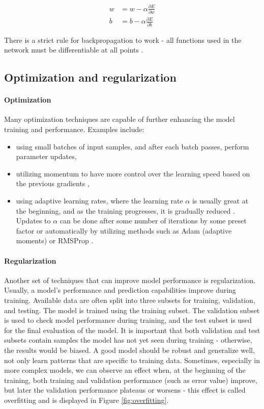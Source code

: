 \begin{align}
\label{eq:w-update}
w &= w - \alpha \frac{\partial E}{\partial w} \\
\label{eq:b-update}
b &=  b - \alpha \frac{\partial E}{\partial b}
\end{align}

There is a strict rule for backpropagation to work - all functions used in the network must be differentiable at all points \cite{Rumelhart1986, Santosh2022-2}.

\subsection{Optimization and regularization}

\paragraph{Optimization}
Many optimization techniques are capable of further enhancing the model training and performance. Examples include:

\begin{itemize}
    \item using small batches of input samples, and after each batch passes, perform parameter updates,
    \item utilizing momentum \cite{Polyak1964} to have more control over the learning speed based on the previous gradients \cite{Santosh2022-2},
    \item using adaptive learning rates, where the learning rate $\alpha$ is usually great at the beginning, and as the training progresses, it is gradually reduced \cite{Santosh2022-2}. Updates to $\alpha$ can be done after some number of iterations by some preset factor or automatically by utilizing methods such as Adam (adaptive moments) \cite{Kingma2014} or RMSProp \cite{Zou2019}.
\end{itemize}

\paragraph{Regularization}
Another set of techniques that can improve model performance is regularization. Usually, a model's performance and prediction capabilities improve during training. Available data are often split into three subsets for training, validation, and testing. The model is trained using the training subset. The validation subset is used to check model performance during training, and the test subset is used for the final evaluation of the model. It is important that both validation and test subsets contain samples the model has not yet seen during training - otherwise, the results would be biased. A good model should be robust and generalize well, not only learn patterns that are specific to training data. Sometimes, especially in more complex models, we can observe an effect when, at the beginning of the training, both training and validation performance (such as error value) improve, but later the validation performance plateaus or worsens - this effect is called overfitting \cite{Schaffer1993} and is displayed in Figure \ref{fig:overfitting}. 

